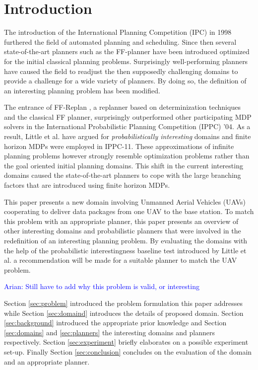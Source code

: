 \documentclass[runningheads,a4paper]{llncs}
\newcommand\todo[1]{\textcolor{blue}{#1}}
\begin{document}

\section{Introduction}
The introduction of the International Planning Competition (IPC) in 1998 furthered the field of automated planning and scheduling. Since then several state-of-the-art planners such as the FF-planner \cite{Hoffmann01theff} have been introduced optimized for the initial classical planning problems. Surprisingly well-performing planners have caused the field to readjust the then supposedly challenging domains to provide a challenge for a wide variety of planners. By doing so, the definition of an interesting planning problem has been modified.

The entrance of FF-Replan \cite{FFReplan}, a replanner based on determinization techniques and the classical FF planner, surprisingly outperformed other participating MDP solvers in the International Probabilistic Planning Competition (IPPC) '04. As a result, Little et al. have argued for \emph{probabilistically interesting} domains \cite{little2007probvsreplan} and finite horizon MDPs were employed in IPPC-11. These approximations of infinite planning problems however strongly resemble optimization problems rather than the goal oriented initial planning domains.  This shift in the current interesting domains caused the state-of-the-art planners to cope with the large branching factors that are introduced using finite horizon MDPs.

This paper presents a new domain involving Unmanned Aerial Vehicles (UAVs) cooperating to deliver data packages from one UAV to the base station. To match this problem with an appropriate planner, this paper presents an overview of other interesting domains and probabilistic planners that were involved in the redefinition of an interesting planning problem. By evaluating the domains with the help of the probabilistic interestingness baseline test introduced by Little et al. \cite{little2007probvsreplan} a recommendation will be made for a suitable planner to match the UAV problem.

\todo{Arian: Still have to add why this problem is valid, or interesting}

Section \ref{sec:problem} introduced the problem formulation this paper addresses while Section \ref{sec:domaind} introduces the details of proposed domain. Section \ref{sec:background} introduced the appropriate prior knowledge and Section \ref{sec:domains} and \ref{sec:planners} the interesting domains and planners respectively. Section \ref{sec:experiment} briefly elaborates on a possible experiment set-up. Finally Section \ref{sec:conclusion} concludes on the evaluation of the domain and an appropriate planner.
\end{document}
